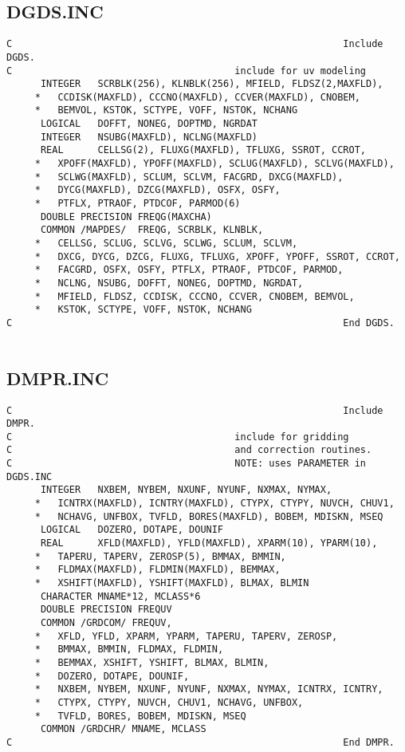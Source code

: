\subsection{DGDS.INC}

\begin{verbatim}
C                                                          Include DGDS.
C                                       include for uv modeling
      INTEGER   SCRBLK(256), KLNBLK(256), MFIELD, FLDSZ(2,MAXFLD),
     *   CCDISK(MAXFLD), CCCNO(MAXFLD), CCVER(MAXFLD), CNOBEM,
     *   BEMVOL, KSTOK, SCTYPE, VOFF, NSTOK, NCHANG
      LOGICAL   DOFFT, NONEG, DOPTMD, NGRDAT
      INTEGER   NSUBG(MAXFLD), NCLNG(MAXFLD)
      REAL      CELLSG(2), FLUXG(MAXFLD), TFLUXG, SSROT, CCROT,
     *   XPOFF(MAXFLD), YPOFF(MAXFLD), SCLUG(MAXFLD), SCLVG(MAXFLD),
     *   SCLWG(MAXFLD), SCLUM, SCLVM, FACGRD, DXCG(MAXFLD),
     *   DYCG(MAXFLD), DZCG(MAXFLD), OSFX, OSFY,
     *   PTFLX, PTRAOF, PTDCOF, PARMOD(6)
      DOUBLE PRECISION FREQG(MAXCHA)
      COMMON /MAPDES/  FREQG, SCRBLK, KLNBLK,
     *   CELLSG, SCLUG, SCLVG, SCLWG, SCLUM, SCLVM,
     *   DXCG, DYCG, DZCG, FLUXG, TFLUXG, XPOFF, YPOFF, SSROT, CCROT,
     *   FACGRD, OSFX, OSFY, PTFLX, PTRAOF, PTDCOF, PARMOD,
     *   NCLNG, NSUBG, DOFFT, NONEG, DOPTMD, NGRDAT,
     *   MFIELD, FLDSZ, CCDISK, CCCNO, CCVER, CNOBEM, BEMVOL,
     *   KSTOK, SCTYPE, VOFF, NSTOK, NCHANG
C                                                          End DGDS.


\end{verbatim}
\subsection{DMPR.INC}

\begin{verbatim}
C                                                          Include DMPR.
C                                       include for gridding
C                                       and correction routines.
C                                       NOTE: uses PARAMETER in DGDS.INC
      INTEGER   NXBEM, NYBEM, NXUNF, NYUNF, NXMAX, NYMAX,
     *   ICNTRX(MAXFLD), ICNTRY(MAXFLD), CTYPX, CTYPY, NUVCH, CHUV1,
     *   NCHAVG, UNFBOX, TVFLD, BORES(MAXFLD), BOBEM, MDISKN, MSEQ
      LOGICAL   DOZERO, DOTAPE, DOUNIF
      REAL      XFLD(MAXFLD), YFLD(MAXFLD), XPARM(10), YPARM(10),
     *   TAPERU, TAPERV, ZEROSP(5), BMMAX, BMMIN,
     *   FLDMAX(MAXFLD), FLDMIN(MAXFLD), BEMMAX,
     *   XSHIFT(MAXFLD), YSHIFT(MAXFLD), BLMAX, BLMIN
      CHARACTER MNAME*12, MCLASS*6
      DOUBLE PRECISION FREQUV
      COMMON /GRDCOM/ FREQUV,
     *   XFLD, YFLD, XPARM, YPARM, TAPERU, TAPERV, ZEROSP,
     *   BMMAX, BMMIN, FLDMAX, FLDMIN,
     *   BEMMAX, XSHIFT, YSHIFT, BLMAX, BLMIN,
     *   DOZERO, DOTAPE, DOUNIF,
     *   NXBEM, NYBEM, NXUNF, NYUNF, NXMAX, NYMAX, ICNTRX, ICNTRY,
     *   CTYPX, CTYPY, NUVCH, CHUV1, NCHAVG, UNFBOX,
     *   TVFLD, BORES, BOBEM, MDISKN, MSEQ
      COMMON /GRDCHR/ MNAME, MCLASS
C                                                          End DMPR.


\end{verbatim}
